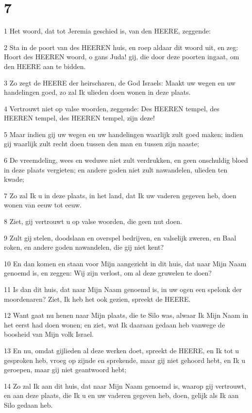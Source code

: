 \chapter{7}

\par 1 Het woord, dat tot Jeremia geschied is, van den HEERE, zeggende:
\par 2 Sta in de poort van des HEEREN huis, en roep aldaar dit woord uit, en zeg: Hoort des HEEREN woord, o gans Juda! gij, die door deze poorten ingaat, om den HEERE aan te bidden.
\par 3 Zo zegt de HEERE der heirscharen, de God Israels: Maakt uw wegen en uw handelingen goed, zo zal Ik ulieden doen wonen in deze plaats.
\par 4 Vertrouwt niet op valse woorden, zeggende: Des HEEREN tempel, des HEEREN tempel, des HEEREN tempel, zijn deze!
\par 5 Maar indien gij uw wegen en uw handelingen waarlijk zult goed maken; indien gij waarlijk zult recht doen tussen den man en tussen zijn naaste;
\par 6 De vreemdeling, wees en weduwe niet zult verdrukken, en geen onschuldig bloed in deze plaats vergieten; en andere goden niet zult nawandelen, ulieden ten kwade;
\par 7 Zo zal Ik u in deze plaats, in het land, dat Ik uw vaderen gegeven heb, doen wonen van eeuw tot eeuw.
\par 8 Ziet, gij vertrouwt u op valse woorden, die geen nut doen.
\par 9 Zult gij stelen, doodslaan en overspel bedrijven, en valselijk zweren, en Baal roken, en andere goden nawandelen, die gij niet kent?
\par 10 En dan komen en staan voor Mijn aangezicht in dit huis, dat naar Mijn Naam genoemd is, en zeggen: Wij zijn verlost, om al deze gruwelen te doen?
\par 11 Is dan dit huis, dat naar Mijn Naam genoemd is, in uw ogen een spelonk der moordenaren? Ziet, Ik heb het ook gezien, spreekt de HEERE.
\par 12 Want gaat nu henen naar Mijn plaats, die te Silo was, alwaar Ik Mijn Naam in het eerst had doen wonen; en ziet, wat Ik daaraan gedaan heb vanwege de boosheid van Mijn volk Israel.
\par 13 En nu, omdat gijlieden al deze werken doet, spreekt de HEERE, en Ik tot u gesproken heb, vroeg op zijnde en sprekende, maar gij niet gehoord hebt, en Ik u geroepen, maar gij niet geantwoord hebt;
\par 14 Zo zal Ik aan dit huis, dat naar Mijn Naam genoemd is, waarop gij vertrouwt, en aan deze plaats, die Ik u en uw vaderen gegeven heb, doen, gelijk als Ik aan Silo gedaan heb.
